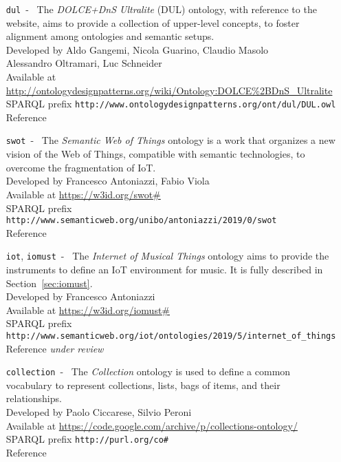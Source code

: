 \documentclass[11pt, twoside, openright]{report}   	%
\begin{document}
\begin{enumerate}
\item[\texttt{dul}~-~] The \textit{DOLCE+DnS Ultralite} (DUL) ontology, with reference to the website, aims to provide a collection of upper-level concepts, to foster alignment among ontologies and semantic setups. \\
Developed by \hfill Aldo Gangemi, Nicola Guarino, Claudio Masolo\\
\null \hfill Alessandro Oltramari, Luc Schneider \\
Available at \faLevelDown \hfill \null \\
\null \hfill \url{http://ontologydesignpatterns.org/wiki/Ontology:DOLCE\%2BDnS_Ultralite} \\
SPARQL prefix \hfill \texttt{http://www.ontologydesignpatterns.org/ont/dul/DUL.owl} \\
Reference \hfill \cite{gangemi2002sweetening}

\item[\texttt{swot}~-~] The \textit{Semantic Web of Things} ontology is a work that organizes a new vision of the Web of Things, compatible with semantic technologies, to overcome the fragmentation of IoT. \\
Developed by \hfill Francesco Antoniazzi, Fabio Viola \\
Available at \hfill \url{https://w3id.org/swot\#}\\
SPARQL prefix \hfill \null \texttt{http://www.semanticweb.org/unibo/antoniazzi/2019/0/swot} \\
Reference \hfill \cite{antoniazzi2019building}

\item[\texttt{iot}, \texttt{iomust}~-~] The \textit{Internet of Musical Things} ontology aims to provide the instruments to define an IoT environment for music. It is fully described in Section~\ref{sec:iomust}. \\
Developed by \hfill Francesco Antoniazzi \\
Available at \hfill \url{https://w3id.org/iomust\#}\\
SPARQL prefix\faLevelDown \hfill \null \\
\null \hfill \texttt{http://www.semanticweb.org/iot/ontologies/2019/5/internet\_of\_things} \\
Reference \hfill \textit{under review}

\item[\texttt{collection}~-~] The \textit{Collection} ontology is used to define a common vocabulary to represent collections, lists, bags of items, and their relationships.\\
Developed by \hfill Paolo Ciccarese, Silvio Peroni \\
Available at \hfill \url{https://code.google.com/archive/p/collections-ontology/}\\
SPARQL prefix \hfill \texttt{http://purl.org/co\#}\\
Reference \hfill \cite{ciccarese2014collections}


\end{enumerate}
\end{document}
